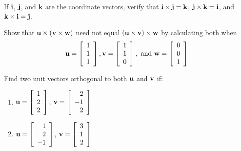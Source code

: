 \begin{multicols}{2}
\begin{ex}
If $\textbf{i}$, $\textbf{j}$, and $\textbf{k}$ are the coordinate vectors, verify that $\textbf{i} \times \textbf{j} = \textbf{k}$, $\textbf{j} \times \textbf{k} = \textbf{i}$, and $\textbf{k} \times \textbf{i} = \textbf{j}$.
\end{ex}

\begin{ex}
Show that $\textbf{u} \times (\textbf{v} \times \textbf{w})$ need not equal $(\textbf{u} \times \textbf{v}) \times \textbf{w}$ by calculating both when
\begin{equation*}
\textbf{u} = \left[
\begin{array}{r}
1\\
1\\
1
\end{array}
\right],
\textbf{v} = \left[
\begin{array}{r}
1\\
1\\
0
\end{array}
\right], \mbox{ and }
\textbf{w} = \left[
\begin{array}{r}
0\\
0\\
1
\end{array}
\right]
\end{equation*}
\end{ex}

\begin{ex}
Find two unit vectors orthogonal to both $\textbf{u}$ and $\textbf{v}$ if:


\begin{enumerate}[label={\alph*.}]
\item 
$\textbf{u} = \left[
\begin{array}{r}
1\\
2\\
2
\end{array}
\right]$, 
$\textbf{v} = \left[
\begin{array}{r}
2\\
-1\\
2
\end{array}
\right]$

\item 
$\textbf{u} = \left[
\begin{array}{r}
1\\
2\\
-1
\end{array}
\right]$, 
$\textbf{v} = \left[
\begin{array}{r}
3\\
1\\
2
\end{array}
\right]$



\end{enumerate}
\end{ex}
\end{multicols}

